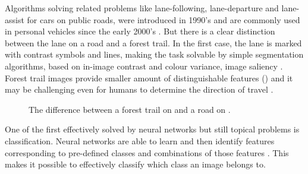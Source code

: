 Algorithms solving related problems like lane-following, lane-departure and lane-assist for cars on public roads, were introduced in 1990's \cite{batavia1999driver} and are commonly used in personal vehicles since the early 2000's \cite{chen2020lane}. But there is a clear distinction between the lane on a road and a forest trail. In the first case, the lane is marked with contrast symbols and lines, making the task solvable by simple segmentation algorithms, based on in-image contrast and colour variance, image saliency \cite{santana2013tracking}. Forest trail images provide smaller amount of distinguishable features () and it may be challenging even for humans to determine the direction of travel \cite{giusti2016machine}.

\begin{figure}[H]
  \centering
  \caption{The difference between a forest trail on  and a road on .}
  \label{fig:features_difference}
\end{figure}

One of the first effectively solved by neural networks but still topical problems is classification. Neural networks are able to learn and then identify features corresponding to pre-defined classes and combinations of those features \cite{krizhevsky2012imagenet}. This makes it possible to effectively classify which class an image belongs to. 

